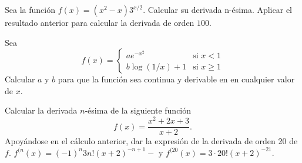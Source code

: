 {Sea la función $f(x)=(x^{2}-x)3^{x/2}.$ Calcular su derivada n-ésima. Aplicar el resultado anterior para calcular la derivada de orden $100$.
}


{Sea 
\[
f(x)=
\begin{cases}
ae^{-x^2} & \mbox{si $x<1$} \\
b\log (1/x)+1 & \mbox{si $x\geq 1$}
\end{cases}
\]
Calcular $a$ y $b$ para que la función sea continua y derivable en en cualquier valor de $x$.
}


{Calcular la derivada $n$-ésima de la siguiente función
\[
f(x)= \frac{x^2+2x+3}{x+2}.
\]
Apoyándose en el cálculo anterior, dar la expresión de la derivada de orden 20 de $f$. 
}
{$f^{(n}(x) = (-1)^n 3n!(x+2)^{-n+1}-$ y $f^{(20}(x) = 3\cdot 20!(x+2)^{-21}$.
}
{
}


